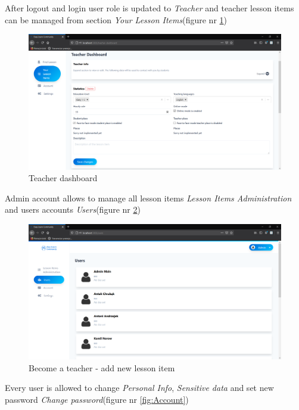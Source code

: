 After logout and login user role is updated to \textit{Teacher} and teacher lesson items can be managed from section \textit{Your Lesson Items}(figure nr \ref{fig:TeacherDashboard})
\begin{figure}[H]
    \centering
    \includegraphics[width=\textwidth]{Include/Resources/Frontend/TeacherDashboard.png}
    \caption{Teacher dashboard} 
    \label{fig:TeacherDashboard}
\end{figure}

Admin account allows to manage all lesson items \textit{Lesson Items Administration} and users accounts \textit{Users}(figure nr \ref{fig:Admin})

\begin{figure}[H]
    \centering
    \includegraphics[width=\textwidth]{Include/Resources/Frontend/Admin.png}
    \caption{Become a teacher - add new lesson item} 
    \label{fig:Admin}
\end{figure}

Every user is allowed to change \textit{Personal Info}, \textit{Sensitive data} and set new password \textit{Change password}(figure nr \ref{fig:Account})

